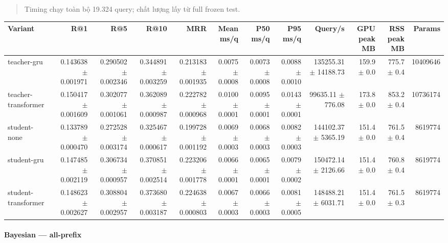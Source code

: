 \begin{quote}\small Timing chạy toàn bộ 19.324 query; chất lượng lấy từ full frozen test.\end{quote}
\begin{table}[!htbp]
\centering
\scriptsize
\setlength{\tabcolsep}{2.5pt}
\begin{adjustbox}{max width=\textwidth}
\begin{tabular}{@{}lrrrrrrrrrrr@{}}
\toprule
Variant & R@1 & R@5 & R@10 & MRR & Mean ms/q & P50 ms/q & P95 ms/q & Query/s & GPU peak MB & RSS peak MB & Params \\
\midrule
teacher-gru & 0.143638 $\pm$ 0.001971 & 0.290502 $\pm$ 0.002346 & 0.344891 $\pm$ 0.003259 & 0.213183 $\pm$ 0.001935 & 0.0075 $\pm$ 0.0008 & 0.0073 $\pm$ 0.0008 & 0.0088 $\pm$ 0.0010 & 135255.31 $\pm$ 14188.73 & 159.9 $\pm$ 0.0 & 775.7 $\pm$ 0.4 & 10409646 \\
teacher-transformer & 0.150417 $\pm$ 0.001609 & 0.302077 $\pm$ 0.001061 & 0.362089 $\pm$ 0.000987 & 0.222782 $\pm$ 0.000968 & 0.0100 $\pm$ 0.0001 & 0.0095 $\pm$ 0.0001 & 0.0143 $\pm$ 0.0001 & 99635.11 $\pm$ 776.08 & 173.8 $\pm$ 0.0 & 853.2 $\pm$ 0.4 & 10736174 \\
student-none & 0.133789 $\pm$ 0.000470 & 0.272528 $\pm$ 0.003174 & 0.325467 $\pm$ 0.000617 & 0.199728 $\pm$ 0.001192 & 0.0069 $\pm$ 0.0003 & 0.0068 $\pm$ 0.0003 & 0.0082 $\pm$ 0.0003 & 144102.37 $\pm$ 5365.19 & 151.4 $\pm$ 0.0 & 761.5 $\pm$ 0.4 & 8619774 \\
student-gru & 0.147485 $\pm$ 0.002119 & 0.306734 $\pm$ 0.000957 & 0.370851 $\pm$ 0.002514 & 0.223206 $\pm$ 0.001778 & 0.0066 $\pm$ 0.0001 & 0.0065 $\pm$ 0.0001 & 0.0079 $\pm$ 0.0002 & 150472.14 $\pm$ 2126.66 & 151.4 $\pm$ 0.0 & 760.8 $\pm$ 0.4 & 8619774 \\
student-transformer & 0.148623 $\pm$ 0.002627 & 0.308804 $\pm$ 0.002957 & 0.373680 $\pm$ 0.003187 & 0.224638 $\pm$ 0.000803 & 0.0067 $\pm$ 0.0003 & 0.0066 $\pm$ 0.0003 & 0.0081 $\pm$ 0.0005 & 148488.21 $\pm$ 6031.71 & 151.4 $\pm$ 0.0 & 761.5 $\pm$ 0.3 & 8619774 \\
\bottomrule
\end{tabular}
\end{adjustbox}
\end{table}

\paragraph{Bayesian --- all-prefix}

